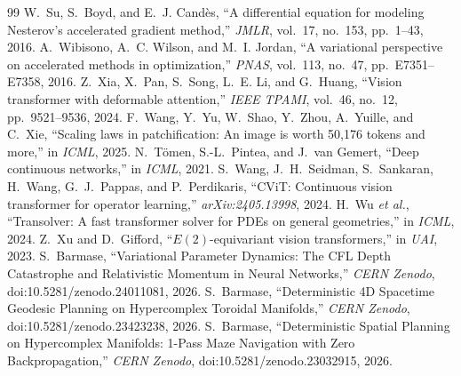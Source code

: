 \documentclass[10pt,twocolumn]{article}
\begin{document}
\begin{thebibliography}{99}
 W.~Su, S.~Boyd, and E.~J. Cand{\`e}s, ``A differential equation for modeling Nesterov's accelerated gradient method,'' \textit{JMLR}, vol.~17, no.~153, pp.~1--43, 2016.
 A.~Wibisono, A.~C. Wilson, and M.~I. Jordan, ``A variational perspective on accelerated methods in optimization,'' \textit{PNAS}, vol.~113, no.~47, pp.~E7351--E7358, 2016.
 Z.~Xia, X.~Pan, S.~Song, L.~E. Li, and G.~Huang, ``Vision transformer with deformable attention,'' \textit{IEEE TPAMI}, vol.~46, no.~12, pp.~9521--9536, 2024.
 F.~Wang, Y.~Yu, W.~Shao, Y.~Zhou, A.~Yuille, and C.~Xie, ``Scaling laws in patchification: An image is worth 50,176 tokens and more,'' in \textit{ICML}, 2025.
 N.~T{\"o}men, S.-L.~Pintea, and J.~van Gemert, ``Deep continuous networks,'' in \textit{ICML}, 2021.
 S.~Wang, J.~H.~Seidman, S.~Sankaran, H.~Wang, G.~J.~Pappas, and P.~Perdikaris, ``CViT: Continuous vision transformer for operator learning,'' \textit{arXiv:2405.13998}, 2024.
 H.~Wu \textit{et al.}, ``Transolver: A fast transformer solver for PDEs on general geometries,'' in \textit{ICML}, 2024.
 Z.~Xu and D.~Gifford, ``$E(2)$-equivariant vision transformers,'' in \textit{UAI}, 2023.
 S.~Barmase, ``Variational Parameter Dynamics: The CFL Depth Catastrophe and Relativistic Momentum in Neural Networks,'' \textit{CERN Zenodo}, doi:10.5281/zenodo.24011081, 2026.
 S.~Barmase, ``Deterministic 4D Spacetime Geodesic Planning on Hypercomplex Toroidal Manifolds,'' \textit{CERN Zenodo}, doi:10.5281/zenodo.23423238, 2026.
 S.~Barmase, ``Deterministic Spatial Planning on Hypercomplex Manifolds: 1-Pass Maze Navigation with Zero Backpropagation,'' \textit{CERN Zenodo}, doi:10.5281/zenodo.23032915, 2026.
\end{thebibliography}
\end{document}
